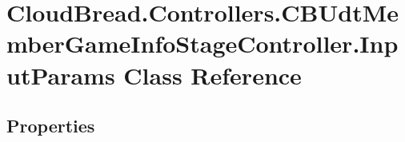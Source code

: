 \hypertarget{class_cloud_bread_1_1_controllers_1_1_c_b_udt_member_game_info_stage_controller_1_1_input_params}{}\section{Cloud\+Bread.\+Controllers.\+C\+B\+Udt\+Member\+Game\+Info\+Stage\+Controller.\+Input\+Params Class Reference}
\label{class_cloud_bread_1_1_controllers_1_1_c_b_udt_member_game_info_stage_controller_1_1_input_params}
\subsection*{Properties}
